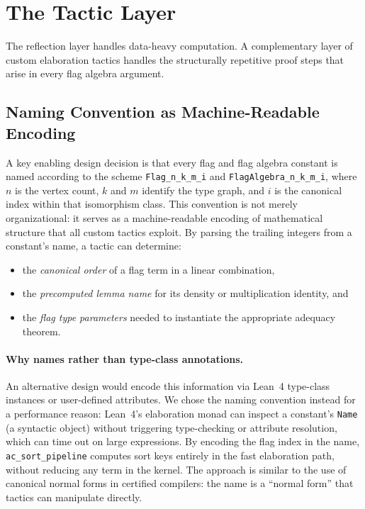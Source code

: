 \documentclass{article}
\newcommand{\lean}[1]{\texttt{#1}}
\begin{document}
\section{The Tactic Layer}
\label{sec:tactics}

The reflection layer handles data-heavy computation.  A complementary layer of
custom elaboration tactics handles the structurally repetitive proof steps that
arise in every flag algebra argument.

\subsection{Naming Convention as Machine-Readable Encoding}

A key enabling design decision is that every flag and flag algebra constant is
named according to the scheme \lean{Flag\_n\_k\_m\_i} and
\lean{FlagAlgebra\_n\_k\_m\_i}, where $n$ is the vertex count, $k$ and $m$
identify the type graph, and $i$ is the canonical index within that
isomorphism class.  This convention is not merely organizational: it serves as
a machine-readable encoding of mathematical structure that all custom tactics
exploit.  By parsing the trailing integers from a constant's name, a tactic can
determine:
\begin{itemize}
  \item the \emph{canonical order} of a flag term in a linear combination,
  \item the \emph{precomputed lemma name} for its density or multiplication
    identity, and
  \item the \emph{flag type parameters} needed to instantiate the appropriate
    adequacy theorem.
\end{itemize}

\paragraph{Why names rather than type-class annotations.}
An alternative design would encode this information via Lean~4 type-class
instances or user-defined attributes.  We chose the naming convention instead
for a performance reason: Lean~4's elaboration monad can inspect a constant's
\lean{Name} (a syntactic object) without triggering type-checking or
attribute resolution, which can time out on large expressions.  By encoding
the flag index in the name, \lean{ac\_sort\_pipeline} computes sort keys
entirely in the fast elaboration path, without reducing any term in the kernel.
The approach is similar to the use of canonical normal forms in certified
compilers: the name is a ``normal form'' that tactics can manipulate directly.
\end{document}
